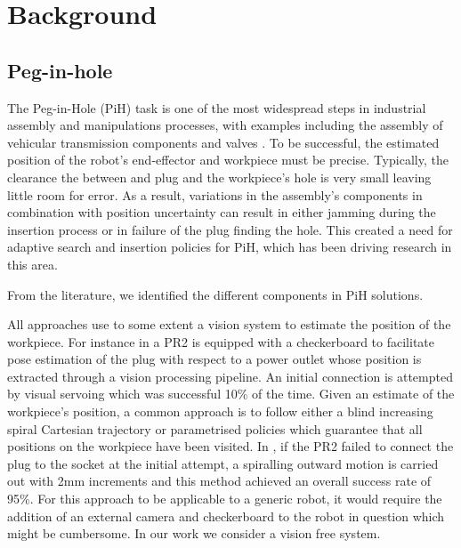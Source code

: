 \section{Background}\label{ch4:background}

\subsection{Peg-in-hole}

The Peg-in-Hole (PiH) task is one of the most widespread steps in industrial assembly and manipulations processes, with 
examples including the assembly of vehicular transmission components \cite{search_strategies_icra_2001} and 
valves \cite{online_gpr_icra_2014}. To be successful, the estimated
position of the robot's end-effector and workpiece must be precise. Typically, the clearance the between 
and plug and the workpiece's hole is very small leaving little room for error. As a result, variations in the assembly's components 
in combination with position uncertainty can result in either jamming during the insertion process or in failure of 
the plug finding the hole. This created a need for adaptive search and insertion policies for PiH, which has been driving research 
in this area. 

From the literature, we identified the different components in PiH solutions. 

All approaches use to some extent a vision system to estimate the position of the workpiece. 
For instance in \cite{peg_personal_icra_2010} a PR2 is equipped with a checkerboard to facilitate pose 
estimation  of the plug with respect to a power outlet whose position is extracted through a vision 
processing pipeline. An initial connection is attempted by visual servoing which was successful 10\% of the 
time. Given an estimate of the workpiece's position, a common approach is to follow either a blind increasing spiral 
Cartesian trajectory or parametrised policies which guarantee that all positions on the workpiece have been visited.
In \cite{peg_personal_icra_2010}, if the PR2 failed to connect the plug to the socket at the initial attempt, 
a spiralling outward motion is carried out with 2mm increments and this method achieved an overall 
success rate of 95\%. For this approach to be applicable to a generic robot, it would require the addition of an
external camera and checkerboard to the robot in question which might be cumbersome. In our work we consider a 
vision free system.


